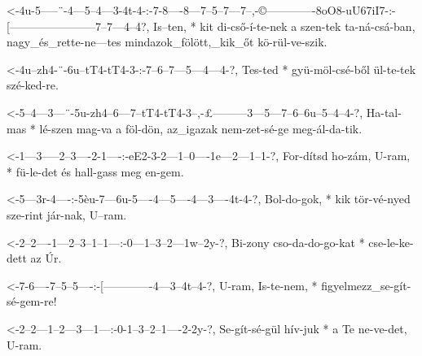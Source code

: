 
  {<-4u-5-----¨-4---5--4---3-4t-4-:-7-8----8---7--5--7---7--,-©-------------8oO8-uU67iI7-:-[-----------------------7--7---4--4?,}
  {  Is--ten, * kit di-cső-í-te-nek a szen-tek ta-ná-csá-ban, nagy_és_rette-ne---tes       mindazok_fölött,_kik_őt kö-rül-ve-szik.}

  {<-4u--zh4-¨-6u--tT4-tT4-3-:-7--6--7---5---4---4-?,}
  {  Tes-ted * gyü-möl-csé-ből ül-te-tek szé-ked-re.}

  {<-5--4---3---¨-5u-zh4--6---7--tT4-tT4-3--,-£---------3---5---7--6--6u--5--4--4-?,}
  {  Ha-tal-mas * lé-szen mag-va a   föl-dön, az_igazak nem-zet-sé-ge meg-ál-da-tik.}



  {<-1---3-----2--3----2-1----:-eE2-3-2---1--0----1e---2---1--1-?,}
  {  For-dítsd ho-zám, U-ram, * fü-le-det és hall-gass meg en-gem.}

  {<-5---3r-4----:-5èu-7---6u-5----4---5----4---3----4t-4-?,}
  {  Bol-do-gok, * kik tör-vé-nyed sze-rint jár-nak, U--ram.}


  {<-2--2----1---2--3--1--1---:-0---1--3--2---1w--2y-?,}
  {  Bi-zony cso-da-do-go-kat * cse-le-ke-dett az Úr.}


  {<-7-6----7--5--5----:-[-------------4---3--4t--4-?,}
  {  U-ram, Is-te-nem, * figyelmezz_se-gít-sé-gem-re!}

  {<-2--2---1--2---3---1---:-0-1--3--2--1----2-2y-?,}
  {  Se-gít-sé-gül hív-juk * a Te ne-ve-det, U-ram.}


